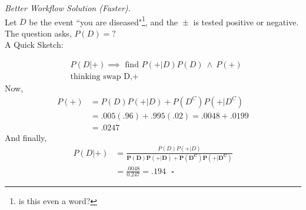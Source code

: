 \documentclass[12pt]{book}
\begin{document}
\newpage
\noindent \hypertarget{better workflow solution faster}{\textit{Better Workflow Solution (Faster).}} \\
Let $D$ be the event ``you are diseased"\footnote{is this even a word?}, and the $\boxed{\pm}$ is tested positive or negative.\\
The question asks, $P(D)=?$\\
A Quick Sketch:\\
\begin{center}
\end{center}
\begin{align*}
&P(D|+)\implies{\text{~find~}}P(+|D)P(D) ~\land~P(+)	\\
&\text{thinking swap D,+}
\end{align*}
Now,
\begin{align*}
P(+)&=\boxed{P(D)P(+|D)}+P(D^C)P(+|D^C)\\
&=\boxed{.005(.96)}+.995(.02)=\boxed{.0048}+.0199\\
&=\mathbf{.0247}
\end{align*}
And finally,
\begin{align*}
P(D|+)&=\frac{\boxed{P(D)P(+|D)}}{\mathbf{P(D)P(+|D)+P(D^C)P(+|D^C)}}\\
&=\frac{\boxed{.0048}}{\mathbf{0.247}}=.194~~~\square
\end{align*}
\newpage
\end{document}
